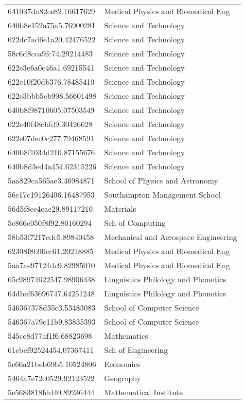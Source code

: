 \begin{tabular}{ll}
641037da82ce82.16617629 & Medical Physics and Biomedical Eng \\
640b8e152a75a5.76900281 & Science and Technology \\
622dc7ad6e1a20.42476522 & Science and Technology \\
58c6d8cca9fc74.29214483 & Science and Technology \\
622e3e6a0e46a1.69215541 & Science and Technology \\
622e10f20db376.78485410 & Science and Technology \\
622e3bbb5eb998.56601498 & Science and Technology \\
640b8f98710605.07503549 & Science and Technology \\
622e40f48cbfd9.30426628 & Science and Technology \\
622e07dec0c277.79468591 & Science and Technology \\
640b8f1034d210.87155676 & Science and Technology \\
640b8d3ed4a454.62315226 & Science and Technology \\
5aa829ca565ae3.46984871 & School of Physics and Astronomy \\
56e17c19126406.16487953 & Southampton Management School \\
56d5f8ee4eae29.89117210 & Materials \\
5c866e050f8f92.80160294 & Sch of Computing \\
58b53f7217cdc5.89840458 & Mechanical and Aerospace Engineering \\
62308f8b90cc61.20218885 & Medical Physics and Biomedical Eng \\
5aa7ae97124dc9.82985010 & Medical Physics and Biomedical Eng \\
65c98974622547.98906438 & Linguistics Philology and Phonetics \\
64dbef63696747.64251248 & Linguistics Philology and Phonetics \\
546367378d35c3.53483083 & School of Computer Science \\
546367a79c11b9.83835393 & School of Computer Science \\
545cc8d77af1f6.68823698 & Mathematics \\
61ebef92524454.07367411 & Sch of Engineering \\
5e66a21beb69b5.10524806 & Economics \\
5464a7e72c0529.92123522 & Geography \\
5e5683818fdd40.89236444 & Mathematical Institute \\

\end{tabular}
